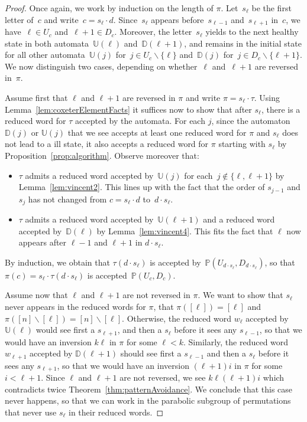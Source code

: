\documentclass[ALCO]{cedram}
\newcommand{\ssm}{\smallsetminus}
\newcommand{\automatonP}{\mathbb{P}}
\newcommand{\automatonU}{\mathbb{U}}
\newcommand{\automatonD}{\mathbb{D}}
\begin{document}
\begin{proof}
Once again, we work by induction on the length of $\pi$.
Let~$s_\ell$ be the first letter of~$c$ and write~$c = s_\ell \cdot d$.
Since~$s_\ell$ appears before~$s_{\ell-1}$ and~$s_{\ell+1}$ in~$c$, we have~$\ell \in U_c$ and~$\ell+1 \in D_c$.
Moreover, the letter~$s_\ell$ yields to the next healthy state in both automata~$\automatonU(\ell)$ and~$\automatonD(\ell+1)$, and remains in the initial state for all other automata~$\automatonU(j)$ for~$j \in U_c \ssm \{\ell\}$ and~$\automatonD(j)$ for~$j \in D_c \ssm \{\ell+1\}$.
We now distinguish two cases, depending on whether~$\ell$ and~$\ell+1$ are reversed in~$\pi$.

Assume first that $\ell$ and $\ell+1$ are reversed in $\pi$ and write $\pi = s_\ell \cdot \tau$. Using Lemma~\ref{lem:coxeterElementFacts} it suffices now to show that after $s_\ell$, there is a reduced word for $\tau$ accepted by the automata. For each $j$, since the automaton $\automatonD(j)$ or $\automatonU(j)$ that we see accepts at least one reduced word for $\pi$ and $s_\ell$ does not lead to a ill state, it also accepts a reduced word for $\pi$ starting with $s_\ell$ by Proposition~\ref{prop:algorithm}. Observe moreover that:
\begin{itemize}
\item $\tau$ admits a reduced word accepted by~$\automatonU(j)$ for each~$j \notin \{\ell, \ell+1\}$ by Lemma~\ref{lem:vincent2}. This lines up with the fact that the order of $s_{j-1}$ and $s_j$ has not changed from $c = s_\ell \cdot d$ to~$d \cdot s_\ell$.
\item $\tau$ admits a reduced word accepted by~$\automatonU(\ell+1)$ and a reduced word accepted by~$\automatonD(\ell)$ by Lemma~\ref{lem:vincent4}. This fits the fact that $\ell$ now appears after $\ell-1$ and $\ell+1$ in $d \cdot s_\ell$.
\end{itemize}
By induction, we obtain that $\tau(d \cdot s_\ell)$ is accepted by~$\automatonP(U_{d \cdot s_\ell}, D_{d \cdot s_\ell})$, so that ${\pi(c) = s_\ell \cdot \tau(d \cdot s_\ell)}$ is accepted~$\automatonP(U_c, D_c)$.
	
Assume now that $\ell$ and $\ell+1$ are not reversed in $\pi$. We want to show that $s_\ell$ never appears in the reduced words for $\pi$, \ie that $\pi([\ell]) = [\ell]$ and $\pi([n] \ssm [\ell]) = [n] \ssm [\ell]$. Otherwise, the reduced word $w_\ell$ accepted by $\automatonU(\ell)$ would see first a $s_{\ell+1}$, and then a $s_\ell$ before it sees any $s_{\ell-1}$, so that we would have an inversion $k \ell$ in $\pi$ for some $\ell < k$. Similarly, the reduced word $w_{\ell+1}$ accepted by $\automatonD(\ell+1)$ should see first a $s_{\ell-1}$ and then a $s_\ell$ before it sees any $s_{\ell+1}$, so that we would have an inversion $(\ell+1) i$ in $\pi$ for some $i < \ell+1$. Since $\ell$ and $\ell+1$ are not reversed, we see $k \ell (\ell+1) i$ which contradicts twice Theorem~\ref{thm:patternAvoidance}. We conclude that this case never happens, so that we can work in the parabolic subgroup of permutations that never use $s_\ell$ in their reduced words.
\end{proof}
\end{document}
